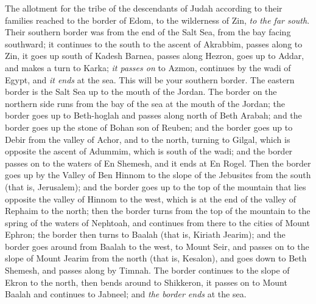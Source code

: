 \begin{biblechapter} %
 The allotment for the tribe of the descendants of Judah according to their families reached to the border of Edom, to the wilderness of Zin, \textit{to the far south}.
\verse Their southern border was from the end of the Salt Sea, from the bay facing southward;
\verse it continues to the south to the ascent of Akrabbim, passes along to Zin, it goes up south of Kadesh Barnea, passes along Hezron, goes up to Addar, and makes a turn to Karka;
\verse \textit{it passes on} to Azmon, continues by the wadi of Egypt, and \textit{it ends} at the sea. This will be your southern border.
\verse The eastern border is the Salt Sea up to the mouth of the Jordan. The border on the northern side runs from the bay of the sea at the mouth of the Jordan;
\verse the border goes up to Beth-hoglah and passes along north of Beth Arabah; and the border goes up the stone of Bohan son of Reuben;
\verse and the border goes up to Debir from the valley of Achor, and to the north, turning to Gilgal, which is opposite the ascent of Adummim, which is south of the wadi; and the border passes on to the waters of En Shemesh, and it ends at En Rogel.
\verse Then the border goes up by the Valley of Ben Hinnom to the slope of the Jebusites from the south (that is, Jerusalem); and the border goes up to the top of the mountain that lies opposite the valley of Hinnom to the west, which is at the end of the valley of Rephaim to the north;
\verse then the border turns from the top of the mountain to the spring of the waters of Nephtoah, and continues from there to the cities of Mount Ephron; the border then turns to Baalah (that is, Kiriath Jearim);
\verse and the border goes around from Baalah to the west, to Mount Seir, and passes on to the slope of Mount Jearim from the north (that is, Kesalon), and goes down to Beth Shemesh, and passes along by Timnah.
\verse The border continues to the slope of Ekron to the north, then bends around to Shikkeron, it passes on to Mount Baalah and continues to Jabneel; and \textit{the border ends} at the sea.

\end{biblechapter}

